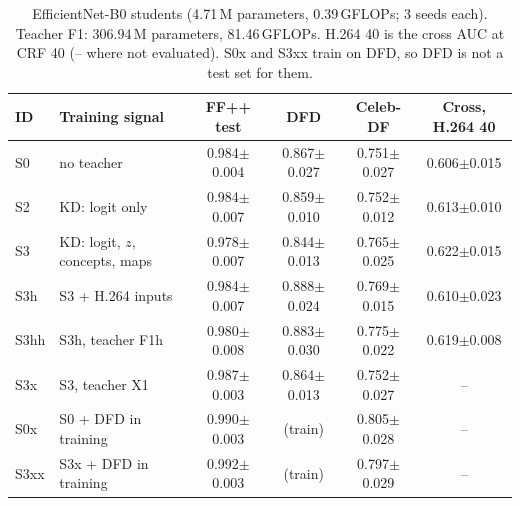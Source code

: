 \begin{table}[t]
\centering
\footnotesize
\caption{EfficientNet-B0 students (4.71\,M parameters, 0.39\,GFLOPs; 3 seeds each). Teacher F1: 306.94\,M parameters, 81.46\,GFLOPs. H.264 40 is the cross AUC at CRF 40 (-- where not evaluated). S0x and S3xx train on DFD, so DFD is not a test set for them.}
\label{tab:students}
\begin{tabular}{llcccc}
\toprule
ID & Training signal & FF++ test & DFD & Celeb-DF & Cross, H.264 40 \\
\midrule
S0 & no teacher & 0.984$\pm$0.004 & 0.867$\pm$0.027 & 0.751$\pm$0.027 & 0.606$\pm$0.015 \\
S2 & KD: logit only & 0.984$\pm$0.007 & 0.859$\pm$0.010 & 0.752$\pm$0.012 & 0.613$\pm$0.010 \\
S3 & KD: logit, $z$, concepts, maps & 0.978$\pm$0.007 & 0.844$\pm$0.013 & 0.765$\pm$0.025 & 0.622$\pm$0.015 \\
\midrule
S3h & S3 + H.264 inputs & 0.984$\pm$0.007 & 0.888$\pm$0.024 & 0.769$\pm$0.015 & 0.610$\pm$0.023 \\
S3hh & S3h, teacher F1h & 0.980$\pm$0.008 & 0.883$\pm$0.030 & 0.775$\pm$0.022 & 0.619$\pm$0.008 \\
\midrule
S3x & S3, teacher X1 & 0.987$\pm$0.003 & 0.864$\pm$0.013 & 0.752$\pm$0.027 & -- \\
S0x & S0 + DFD in training & 0.990$\pm$0.003 & (train) & 0.805$\pm$0.028 & -- \\
S3xx & S3x + DFD in training & 0.992$\pm$0.003 & (train) & 0.797$\pm$0.029 & -- \\
\bottomrule
\end{tabular}
\end{table}

